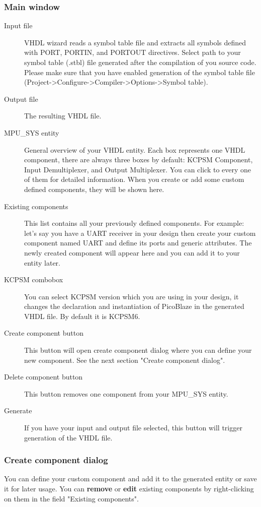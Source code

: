 \subsubsection{Main window}
    \begin{description}
        \item [Input file]
            VHDL wizard reads a symbol table file and extracts all symbols defined with PORT, PORTIN, and PORTOUT directives. Select path to your symbol table (.stbl) file generated after the compilation of you source code. Please make sure that you have enabled generation of the symbol table file (Project->Configure->Compiler->Options->Symbol table).
        \item [Output file]
            The resulting VHDL file.
        \item [MPU\_SYS entity]
            General overview of your VHDL entity. Each box represents one VHDL component, there are always three boxes by default: KCPSM Component, Input Demultiplexer, and Output Multiplexer. You can click to every one of them for detailed information. When you create or add some custom defined components, they will be shown here.
        \item [Existing components]
            This list contains all your previously defined components. For example: let's say you have a UART receiver in your design then create your custom component named UART and define its ports and generic attributes. The newly created component will appear here and you can add it to your entity later.
        \item [KCPSM combobox]
            You can select KCPSM version which you are using in your design, it changes the declaration and instantiation of PicoBlaze in the generated VHDL file. By default it is KCPSM6.
        \item [Create component button]
            This button will open create component dialog where you can define your new component. See the next section "Create component dialog".
        \item [Delete component button]
            This button removes one component from your MPU\_SYS entity.
        \item [Generate]
            If you have your input and output file selected, this button will trigger generation of the VHDL file.
    \end{description}

\subsubsection{Create component dialog}
    You can define your custom component and add it to the generated entity or save it for later usage. You can \textbf{remove} or \textbf{edit} existing components by right-clicking on them in the field "Existing components".

